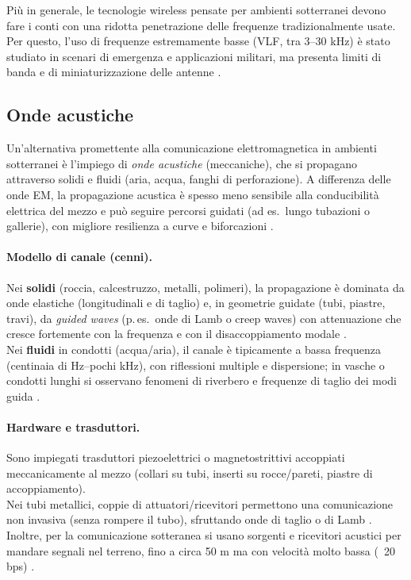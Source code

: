 Più in generale, le tecnologie wireless pensate per ambienti sotterranei devono
fare i conti con una ridotta penetrazione delle frequenze tradizionalmente usate.\\
 Per questo, l'uso di frequenze estremamente basse (VLF, tra 3–30 kHz)
è stato studiato in scenari di emergenza e applicazioni militari, ma presenta
limiti di banda e di miniaturizzazione delle antenne \citep[sec.~5.1]{salam2023survey}.

\subsection{Onde acustiche}
Un'alternativa promettente alla comunicazione elettromagnetica in ambienti sotterranei è l'impiego di \emph{onde acustiche} (meccaniche), 
che si propagano attraverso solidi e fluidi (aria, acqua, fanghi di perforazione). A differenza delle onde EM, la propagazione acustica è 
spesso meno sensibile alla conducibilità elettrica del mezzo e può seguire percorsi guidati (ad es.\ lungo tubazioni o gallerie), con migliore 
resilienza a curve e biforcazioni \citep{fishta2023inpipe,heifetz2017pipes,farai2023mdpe}.

\paragraph{Modello di canale (cenni).}
Nei \textbf{solidi} (roccia, calcestruzzo, metalli, polimeri), la propagazione è dominata da onde elastiche (longitudinali e di taglio) e, in geometrie guidate 
(tubi, piastre, travi), da \emph{guided waves} (p.\,es.\ onde di Lamb o creep waves) con attenuazione che cresce fortemente con la frequenza e 
con il disaccoppiamento modale \citep[p.~2]{bianchi2023spazio}.\\ 
Nei \textbf{fluidi} in condotti (acqua/aria), il canale è tipicamente 
a bassa frequenza (centinaia di Hz–pochi kHz), con riflessioni multiple e dispersione; in vasche o condotti lunghi si osservano fenomeni di riverbero 
e frequenze di taglio dei modi guida \citep{fishta2023inpipe}. \\

\paragraph{Hardware e trasduttori.}
Sono impiegati trasduttori piezoelettrici o magnetostrittivi accoppiati meccanicamente al mezzo (collari su tubi, inserti su rocce/pareti, piastre di accoppiamento).\\
 Nei tubi metallici, coppie di attuatori/ricevitori permettono una comunicazione non invasiva (senza rompere il tubo), sfruttando onde di taglio o di Lamb 
 \citep[sec.~4.1]{heifetz2017pipes}.\\
Inoltre, per la comunicazione sotteranea si usano sorgenti e ricevitori acustici per mandare segnali nel terreno, 
fino a circa 50 m ma con velocità molto bassa (~20 bps) \cite[sec.~2.1]{yang2020soil}.\\

